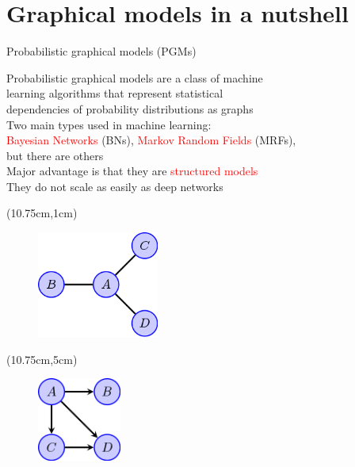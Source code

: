 \documentclass[aspectratio=1610]{beamer}					%
\begin{document}
\section{Graphical models in a nutshell}
\begin{frame}{Probabilistic graphical models (PGMs)}

Probabilistic graphical models are a class of machine \\learning algorithms that represent statistical \\dependencies of probability distributions as graphs\\
\vspace{0.2in}
Two main types used in machine learning: \\\textcolor{red}{Bayesian Networks} (BNs), \textcolor{red}{Markov Random Fields} (MRFs), \\but there are others\\
\vspace{0.2in}
Major advantage is that they are \textcolor{red}{structured models}\\They do not scale as easily as deep networks


\begin{textblock*}{5cm}(10.75cm,1cm)
\begin{figure}
\includegraphics[width=4cm]{mrf.png}
\end{figure}
\end{textblock*}

\begin{textblock*}{5cm}(10.75cm,5cm)
\begin{figure}
\includegraphics[width=2.75cm]{bayes-net.png}
\end{figure}
\end{textblock*}

\end{frame}
\end{document}
